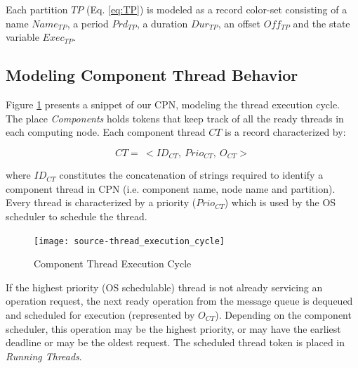 Each partition $TP$ (Eq. \ref{eq:TP}) is modeled as a record color-set consisting of a name $Name_{TP}$, a period $Prd_{TP}$, a duration $Dur_{TP}$, an offset $Off_{TP}$ and the state variable  $Exec_{TP}$. %

\subsection{Modeling Component Thread Behavior}

Figure \ref{fig:Thread_Execution} presents a snippet of our CPN, modeling the thread execution cycle. The place \emph{Components} holds tokens that keep track of all the ready threads in each computing node. Each component thread $CT$ is a record characterized by:

\begin{equation}
\label{eq:CT}
CT = \ <ID_{CT}, \ Prio_{CT}, \ O_{CT}>
\end{equation}

where $ID_{CT}$ constitutes the concatenation of strings required to identify a component thread in CPN (i.e. component name, node name and partition). Every thread is characterized by a priority ($Prio_{CT}$) which is used by the OS scheduler to schedule the thread. 

\begin{figure}[htb]
	\centering
	\texttt{[image: source-thread\_execution\_cycle]}
	\caption{Component Thread Execution Cycle}
	\label{fig:Thread_Execution}
\end{figure}

If the highest priority (OS schedulable) thread is not already servicing an operation request, the next ready operation from the message queue is dequeued and scheduled for execution (represented by $O_{CT}$). Depending on the component scheduler, this operation may be the highest priority, or may have the earliest deadline or may be the oldest request. The scheduled thread token is placed in \emph{Running Threads}. %

